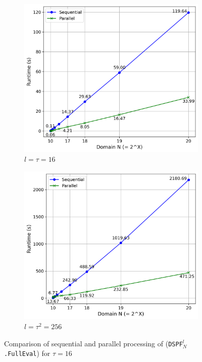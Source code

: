 \begin{figure}[t]
    \hspace{-1em}
    \begin{subfigure}[b]{0.5\textwidth}
        \centering
        \includegraphics[scale=0.49]{images/plots/full_eval_t16.png}
        \caption{$l = \tau = 16$}
    \end{subfigure}
    \hspace{0em}
    \begin{subfigure}[b]{0.5\textwidth}
        \centering
        \includegraphics[scale=0.49]{images/plots/full_eval_t256.png}
        \caption{$l = \tau^2 = 256$}
    \end{subfigure}
    \caption{Comparison of sequential and parallel processing of (\texttt{DSPF}$^{l}_{N}$\texttt{.FullEval}) for $\tau=16$}
    \label{fig:fullEvalChart}
\end{figure}

